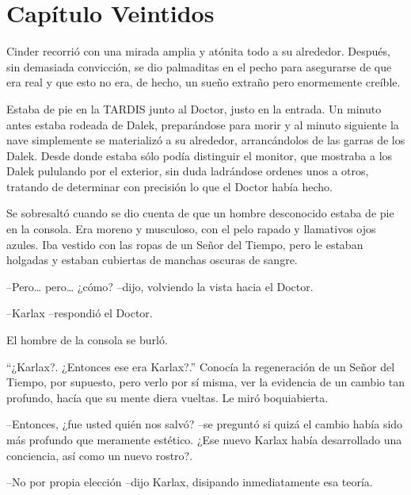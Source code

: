 \chapter*{Capítulo Veintidos}




Cinder recorrió con una mirada amplia y atónita todo a su alrededor. Después, sin demasiada convicción, se dio palmaditas en el pecho para asegurarse de que era real y que esto no era, de hecho, un sueño extraño pero enormemente creíble.



Estaba de pie en la TARDIS junto al Doctor, justo en la entrada. Un minuto antes estaba rodeada de Dalek, preparándose para morir y al minuto siguiente la nave simplemente se materializó a su alrededor, arrancándolos de las garras de los Dalek. Desde donde estaba sólo podía distinguir el  monitor, que mostraba a los Dalek pululando por el exterior, sin duda ladrándose ordenes unos a otros, tratando de determinar con precisión lo que el Doctor había hecho.



Se sobresaltó cuando se dio cuenta de que un hombre desconocido estaba de pie en la consola. Era moreno y musculoso, con el pelo rapado y llamativos ojos azules. Iba vestido con las ropas de un Señor del Tiempo, pero le estaban holgadas y estaban cubiertas de manchas oscuras de sangre.



--Pero… pero… ¿cómo? --dijo, volviendo la vista hacia el Doctor.



--Karlax --respondió el Doctor.



El hombre de la consola se burló.



“¿Karlax?. ¿Entonces ese era Karlax?.” Conocía la regeneración de un Señor del Tiempo, por supuesto, pero verlo por sí misma, ver la evidencia de un cambio tan profundo, hacía que su mente diera vueltas. Le miró boquiabierta. 



--Entonces, ¿fue usted quién nos salvó? --se preguntó si quizá el cambio había sido más profundo que meramente estético. ¿Ese nuevo Karlax había desarrollado una conciencia, así como un nuevo rostro?.



--No por propia elección --dijo Karlax, disipando inmediatamente esa teoría.



